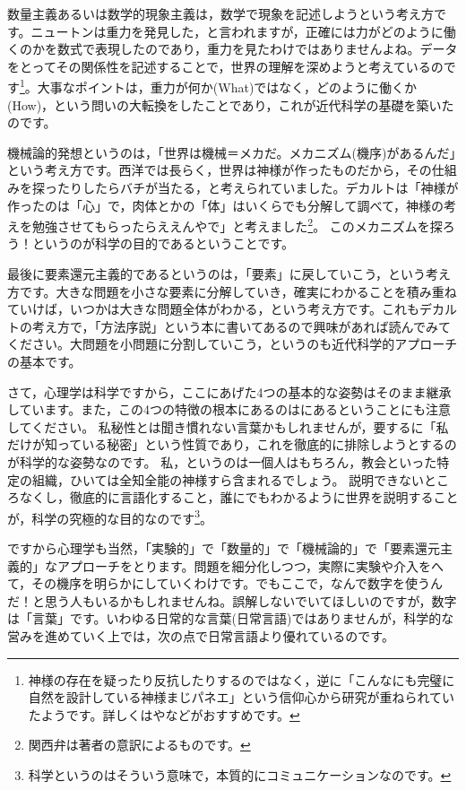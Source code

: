 \documentclass{ltjsbook}
\begin{document}
数量主義あるいは数学的現象主義は，数学で現象を記述しようという考え方です。ニュートンは重力を発見した，と言われますが，正確には力がどのように働くのかを数式で表現したのであり，重力を見たわけではありませんよね。データをとってその関係性を記述することで，世界の理解を深めようと考えているのです\footnote{神様の存在を疑ったり反抗したりするのではなく，逆に「こんなにも完璧に自然を設計している神様まじパネエ」という信仰心から研究が重ねられていたようです。詳しくは\citet{IkeuchiR2014}や\citet{Hebizo2016}などがおすすめです。}。大事なポイントは，重力が何か(What)ではなく，どのように働くか(How)，という問いの大転換をしたことであり，これが近代科学の基礎を築いたのです。

機械論的発想というのは，「世界は機械＝メカだ。メカニズム(機序)があるんだ」という考え方です。西洋では長らく，世界は神様が作ったものだから，その仕組みを探ったりしたらバチが当たる，と考えられていました。デカルトは「神様が作ったのは「心」で，肉体とかの「体」はいくらでも分解して調べて，神様の考えを勉強させてもらったらええんやで」と考えました\footnote{関西弁は著者の意訳によるものです。}。
このメカニズムを探ろう！というのが科学の目的であるということです。

最後に要素還元主義的であるというのは，「要素」に戻していこう，という考え方です。大きな問題を小さな要素に分解していき，確実にわかることを積み重ねていけば，いつかは大きな問題全体がわかる，という考え方です。これもデカルトの考え方で，「方法序説」という本に書いてあるので興味があれば読んでみてください\citep{Descartes}。大問題を小問題に分割していこう，というのも近代科学的アプローチの基本です。

さて，心理学は科学ですから，ここにあげた4つの基本的な姿勢はそのまま継承しています。また，この4つの特徴の根本にあるのはにあるということにも注意してください。
私秘性とは聞き慣れない言葉かもしれませんが，要するに「私だけが知っている秘密」という性質であり，これを徹底的に排除しようとするのが科学的な姿勢なのです。
私，というのは一個人はもちろん，教会といった特定の組織，ひいては全知全能の神様すら含まれるでしょう。
説明できないところなくし，徹底的に言語化すること，誰にでもわかるように世界を説明することが，科学の究極的な目的なのです\footnote{科学というのはそういう意味で，本質的にコミュニケーションなのです。}。

ですから心理学も当然，「実験的」で「数量的」で「機械論的」で「要素還元主義的」なアプローチをとります。問題を細分化しつつ，実際に実験や介入をへて，その機序を明らかにしていくわけです。でもここで，なんで数字を使うんだ！と思う人もいるかもしれませんね。誤解しないでいてほしいのですが，数字は「言葉」です。いわゆる日常的な言葉(日常言語)ではありませんが，科学的な営みを進めていく上では，次の点で日常言語より優れているのです。
\end{document}
